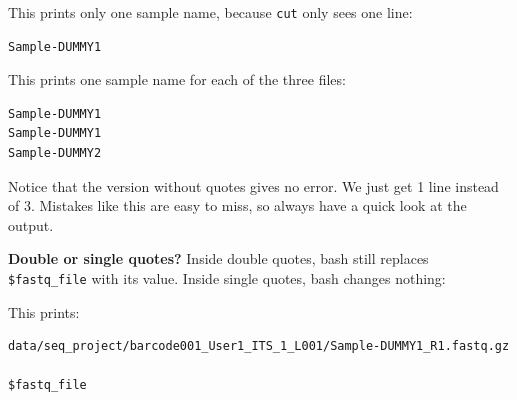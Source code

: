 \documentclass[
  letterpaper,
  DIV=11,
  numbers=noendperiod]{scrreprt}
\newenvironment{Shaded}{}{}
\newcommand{\AttributeTok}[1]{\textcolor[rgb]{0.84,0.23,0.29}{#1}}
\newcommand{\BuiltInTok}[1]{\textcolor[rgb]{0.84,0.23,0.29}{#1}}
\newcommand{\CommentTok}[1]{\textcolor[rgb]{0.42,0.45,0.49}{#1}}
\newcommand{\FunctionTok}[1]{\textcolor[rgb]{0.44,0.26,0.76}{#1}}
\newcommand{\KeywordTok}[1]{\textcolor[rgb]{0.84,0.23,0.29}{#1}}
\newcommand{\StringTok}[1]{\textcolor[rgb]{0.01,0.18,0.38}{#1}}
\newcommand{\VariableTok}[1]{\textcolor[rgb]{0.89,0.38,0.04}{#1}}
\begin{document}
\begin{tcolorbox}
\begin{Shaded}
\end{Shaded}

This prints only one sample name, because \texttt{cut} only sees one
line:

\begin{verbatim}
Sample-DUMMY1
\end{verbatim}

\begin{Shaded}
\end{Shaded}

This prints one sample name for each of the three files:

\begin{verbatim}
Sample-DUMMY1
Sample-DUMMY1
Sample-DUMMY2
\end{verbatim}

Notice that the version without quotes gives no error. We just get 1
line instead of 3. Mistakes like this are easy to miss, so always have a
quick look at the output.

\textbf{Double or single quotes?} Inside double quotes, bash still
replaces \texttt{\$fastq\_file} with its value. Inside single quotes,
bash changes nothing:

\begin{Shaded}
\end{Shaded}

This prints:

\begin{verbatim}
data/seq_project/barcode001_User1_ITS_1_L001/Sample-DUMMY1_R1.fastq.gz

$fastq_file
\end{verbatim}


\end{tcolorbox}
\end{document}
